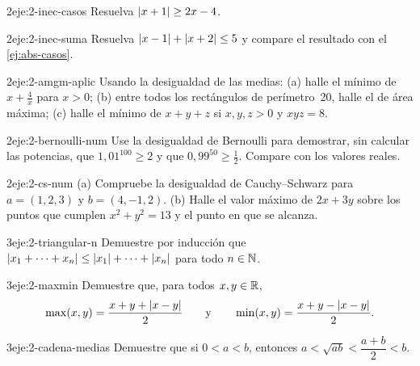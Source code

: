 \begin{ejercicio}{2}{eje:2-inec-casos}
Resuelva $\lvert x+1\rvert\ge 2x-4$.
\end{ejercicio}

\begin{ejercicio}{2}{eje:2-inec-suma}
Resuelva $\lvert x-1\rvert+\lvert x+2\rvert\le5$ y compare el resultado con el \cref{ej:abs-casos}.
\end{ejercicio}

\begin{ejercicio}{2}{eje:2-amgm-aplic}
Usando la desigualdad de las medias: (a) halle el mínimo de $x+\frac4x$ para $x>0$; (b) entre todos los rectángulos de perímetro~20, halle el de área máxima; (c) halle el mínimo de $x+y+z$ si $x,y,z>0$ y $xyz=8$.
\end{ejercicio}

\begin{ejercicio}{2}{eje:2-bernoulli-num}
Use la desigualdad de Bernoulli para demostrar, sin calcular las potencias, que $1{,}01^{100}\ge2$ y que $0{,}99^{50}\ge\frac12$. Compare con los valores reales.
\end{ejercicio}

\begin{ejercicio}{2}{eje:2-cs-num}
(a) Compruebe la desigualdad de Cauchy--Schwarz para $a=(1,2,3)$ y $b=(4,-1,2)$. (b) Halle el valor máximo de $2x+3y$ sobre los puntos que cumplen $x^2+y^2=13$ y el punto en que se alcanza.
\end{ejercicio}

\begin{ejercicio}{3}{eje:2-triangular-n}
Demuestre por inducción que $\lvert x_1+\dots+x_n\rvert\le\lvert x_1\rvert+\dots+\lvert x_n\rvert$ para todo $n\in\mathbb{N}$.
\end{ejercicio}

\begin{ejercicio}{3}{eje:2-maxmin}
Demuestre que, para todos $x,y\in\mathbb{R}$,
\[
\max(x,y)=\frac{x+y+\lvert x-y\rvert}{2}\qquad\text{y}\qquad\min(x,y)=\frac{x+y-\lvert x-y\rvert}{2}.
\]
\end{ejercicio}

\begin{ejercicio}{3}{eje:2-cadena-medias}
Demuestre que si $0<a<b$, entonces $a<\sqrt{ab}<\dfrac{a+b}{2}<b$.
\end{ejercicio}


